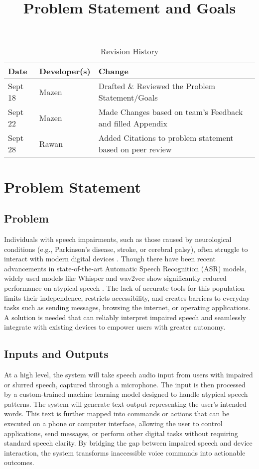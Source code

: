 \documentclass{article}
\title{Problem Statement and Goals\\\progname}
\author{\authname}
\date{}
\begin{document}
\maketitle

\begin{table}[hp]
\caption{Revision History} \label{TblRevisionHistory}
\begin{tabularx}{\textwidth}{llX}
\toprule
\textbf{Date} & \textbf{Developer(s)} & \textbf{Change}\\
\midrule
Sept 18 & Mazen & Drafted \& Reviewed the Problem Statement/Goals\\
Sept 22 & Mazen & Made Changes based on team's Feedback and filled Appendix\\
Sept 28 & Rawan & Added Citations to problem statement based on peer review\\
\bottomrule
\end{tabularx}
\end{table}

\section{Problem Statement}

\subsection{Problem}
Individuals with speech impairments, such as those caused by neurological conditions (e.g., Parkinson's disease, stroke, or cerebral palsy), often struggle to interact with modern digital devices \cite{nidcd2024assistive}. Though there have been recent advancements in state-of-the-art Automatic Speech Recognition (ASR) models, widely used models like Whisper and wav2vec show significantly reduced performance on atypical speech \cite{pokel2025variational}. The lack of accurate tools for this population limits their independence, restricts accessibility, and creates barriers to everyday tasks such as sending messages, browsing the internet, or operating applications. A solution is needed that can reliably interpret impaired speech and seamlessly integrate with existing devices to empower users with greater autonomy.

\subsection{Inputs and Outputs}
At a high level, the system will take speech audio input from users with impaired or slurred speech, captured through a microphone. The input is then processed by a custom-trained machine learning model designed to handle atypical speech patterns. The system will generate text output representing the user's intended words. This text is further mapped into commands or actions that can be executed on a phone or computer interface, allowing the user to control applications, send messages, or perform other digital tasks without requiring standard speech clarity. By bridging the gap between impaired speech and device interaction, the system transforms inaccessible voice commands into actionable outcomes.
\end{document}
